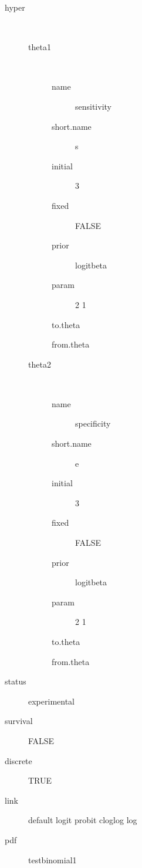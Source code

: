 \begin{description}
	\item[hyper]\ 
	 \begin{description}
	 	\item[theta1]\ 
	 	 \begin{description}
	 	 	 \item[ name ] sensitivity 
	 	 	 \item[ short.name ] s 
	 	 	 \item[ initial ] 3 
	 	 	 \item[ fixed ] FALSE 
	 	 	 \item[ prior ] logitbeta 
	 	 	 \item[ param ] 2 1 
	 	 	 \item[ to.theta ] \verb|| 
	 	 	 \item[ from.theta ] \verb|| 
	 	 \end{description}
	 	\item[theta2]\ 
	 	 \begin{description}
	 	 	 \item[ name ] specificity 
	 	 	 \item[ short.name ] e 
	 	 	 \item[ initial ] 3 
	 	 	 \item[ fixed ] FALSE 
	 	 	 \item[ prior ] logitbeta 
	 	 	 \item[ param ] 2 1 
	 	 	 \item[ to.theta ] \verb|| 
	 	 	 \item[ from.theta ] \verb|| 
	 	 \end{description}
	 \end{description}
	 \item[ status ] experimental 
	 \item[ survival ] FALSE 
	 \item[ discrete ] TRUE 
	 \item[ link ] default logit probit cloglog log 
	 \item[ pdf ] testbinomial1 
\end{description}
